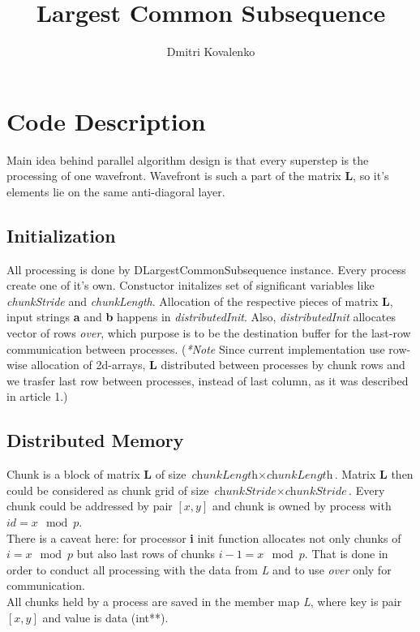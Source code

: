 \documentclass[a4paper]{article}
\begin{document}
\title{Largest Common Subsequence}
\author{Dmitri Kovalenko}

\maketitle

\section{Code Description}
Main idea behind parallel algorithm design is that every superstep is the processing of one wavefront. Wavefront is such a part of the matrix \textbf{L}, so it's elements lie on the same anti-diagoral layer.  
\subsection{Initialization}
All processing is done by DLargestCommonSubsequence instance. Every process create one of it's own.
Constuctor initalizes set of significant variables like \textit{chunkStride} and \textit{chunkLength}.
Allocation of the respective pieces of matrix \textbf{L}, input strings \textbf{a} and \textbf{b} happens in \textit{distributedInit}.
Also, \textit{distributedInit} allocates vector of rows \textit{over}, which purpose is to be the destination buffer for the last-row communication between processes.
(\textit{*Note} Since current implementation use row-wise allocation of 2d-arrays, \textbf{L} distributed between processes by chunk rows and we trasfer last row between processes, instead of last column, as it was described in article 1.)

\subsection{Distributed Memory}
Chunk is a block of matrix \textbf{L} of size $\textit{chunkLength} \times \textit{chunkLength}$.
Matrix \textbf{L} then could be considered as chunk grid of size $\textit{chunkStride} \times \textit{chunkStride}$. Every chunk could be addressed by pair $[x,y]$ and chunk is owned by  process with $id = x \mod p$.\\
There is a caveat here: for processor \textbf{i} init function allocates not only chunks of $i=x \mod p$ but also last rows of chunks $i-1=x \mod p$. That is done in order to conduct all processing with the data from \textit{L} and to use \textit{over} only for communication.\\
All chunks held by a process are saved in the member map \textit{L}, where key is pair $[x,y]$ and value is data (int**).
\end{document}
